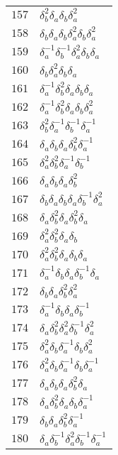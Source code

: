\documentclass{article}
\begin{document}
\begin{center}
\begin{tabular}{ll}
$157$ & $\delta_b^{2}\delta_a^{}\delta_b^{}\delta_a^{2}$ \\
$158$ & $\delta_b^{}\delta_a^{}\delta_b^{}\delta_a^{2}\delta_b^{}\delta_a^{2}$ \\
$159$ & $\delta_a^{-1}\delta_b^{-1}\delta_a^{2}\delta_b^{}\delta_a^{}$ \\
$160$ & $\delta_b^{}\delta_a^{2}\delta_b^{}\delta_a^{}$ \\
$161$ & $\delta_a^{-1}\delta_b^{2}\delta_a^{}\delta_b^{}\delta_a^{}$ \\
$162$ & $\delta_a^{-1}\delta_b^{2}\delta_a^{}\delta_b^{}\delta_a^{2}$ \\
$163$ & $\delta_b^{2}\delta_a^{-1}\delta_b^{-1}\delta_a^{-1}$ \\
$164$ & $\delta_a^{}\delta_b^{}\delta_a^{}\delta_b^{2}\delta_a^{-1}$ \\
$165$ & $\delta_a^{2}\delta_b^{2}\delta_a^{-1}\delta_b^{-1}$ \\
$166$ & $\delta_a^{}\delta_b^{}\delta_a^{}\delta_b^{2}$ \\
$167$ & $\delta_b^{}\delta_a^{}\delta_b^{}\delta_a^{}\delta_b^{-1}\delta_a^{2}$ \\
$168$ & $\delta_a^{}\delta_b^{2}\delta_a^{}\delta_b^{2}\delta_a^{}$ \\
$169$ & $\delta_a^{2}\delta_b^{2}\delta_a^{}\delta_b^{}$ \\
$170$ & $\delta_a^{2}\delta_b^{2}\delta_a^{}\delta_b^{}\delta_a^{}$ \\
$171$ & $\delta_a^{-1}\delta_b^{}\delta_a^{}\delta_b^{-1}\delta_a^{}$ \\
$172$ & $\delta_b^{}\delta_a^{}\delta_b^{2}\delta_a^{2}$ \\
$173$ & $\delta_a^{-1}\delta_b^{}\delta_a^{}\delta_b^{-1}$ \\
$174$ & $\delta_a^{}\delta_b^{2}\delta_a^{2}\delta_b^{-1}\delta_a^{2}$ \\
$175$ & $\delta_a^{2}\delta_b^{}\delta_a^{-1}\delta_b^{}\delta_a^{2}$ \\
$176$ & $\delta_a^{2}\delta_b^{}\delta_a^{-1}\delta_b^{}\delta_a^{-1}$ \\
$177$ & $\delta_a^{}\delta_b^{}\delta_a^{}\delta_b^{2}\delta_a^{}$ \\
$178$ & $\delta_a^{}\delta_b^{2}\delta_a^{}\delta_b^{}\delta_a^{-1}$ \\
$179$ & $\delta_b^{}\delta_a^{}\delta_b^{2}\delta_a^{-1}$ \\
$180$ & $\delta_a^{}\delta_b^{-1}\delta_a^{2}\delta_b^{-1}\delta_a^{-1}$ \\

\end{tabular}
\end{center}
\end{document}
